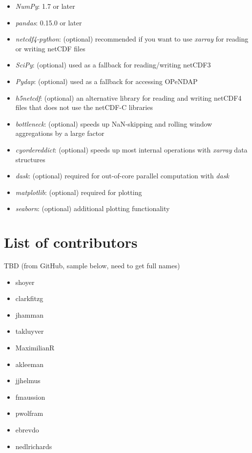 \documentclass{jors}
\begin{document}
\begin{itemize}
\item \textit{NumPy}: 1.7 or later
\item \textit{pandas}: 0.15.0 or later
\item \textit{netcdf4-python}: (optional) recommended if you want to use \textit{xarray} for reading or writing netCDF files
\item \textit{SciPy}: (optional) used as a fallback for reading/writing netCDF3
\item \textit{Pydap}: (optional) used as a fallback for accessing OPeNDAP
\item \textit{h5netcdf}: (optional) an alternative library for reading and writing netCDF4 files that does not use the netCDF-C libraries
\item \textit{bottleneck}: (optional) speeds up NaN-skipping and rolling window aggregations by a large factor
\item \textit{cyordereddict}: (optional) speeds up most internal operations with \textit{xarray} data structures
\item \textit{dask}: (optional) required for out-of-core parallel computation with \textit{dask}
\item \textit{matplotlib}: (optional) required for plotting
\item \textit{seaborn}: (optional) additional plotting functionality
\end{itemize}


\section*{List of contributors}

TBD (from GitHub, sample below, need to get full names)

\begin{itemize}
	\item shoyer
	\item clarkfitzg
	\item jhamman
	\item takluyver
	\item MaximilianR
	\item akleeman
	\item jjhelmus
	\item fmaussion
	\item pwolfram
	\item ebrevdo
	\item nedlrichards
\end{itemize}
\end{document}
